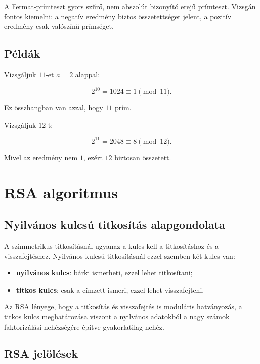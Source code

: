 \begin{warningbox}
A Fermat-prímteszt gyors szűrő, nem abszolút bizonyító erejű prímteszt. Vizsgán fontos kiemelni: a negatív eredmény biztos összetettséget jelent, a pozitív eredmény csak valószínű prímséget.
\end{warningbox}

\subsection{Példák}

Vizsgáljuk $11$-et $a=2$ alappal:

\[
2^{10}=1024\equiv1\pmod{11}.
\]

Ez összhangban van azzal, hogy $11$ prím.

Vizsgáljuk $12$-t:

\[
2^{11}=2048\equiv8\pmod{12}.
\]

Mivel az eredmény nem $1$, ezért $12$ biztosan összetett.

\section{RSA algoritmus}

\subsection{Nyilvános kulcsú titkosítás alapgondolata}

A szimmetrikus titkosításnál ugyanaz a kulcs kell a titkosításhoz és a visszafejtéshez. Nyilvános kulcsú titkosításnál ezzel szemben két kulcs van:

\begin{itemize}
  \item \textbf{nyilvános kulcs}: bárki ismerheti, ezzel lehet titkosítani;
  \item \textbf{titkos kulcs}: csak a címzett ismeri, ezzel lehet visszafejteni.
\end{itemize}

Az RSA lényege, hogy a titkosítás és visszafejtés is moduláris hatványozás, a titkos kulcs meghatározása viszont a nyilvános adatokból a nagy számok faktorizálási nehézségére építve gyakorlatilag nehéz.

\subsection{RSA jelölések}

\begin{center}

\end{center}


